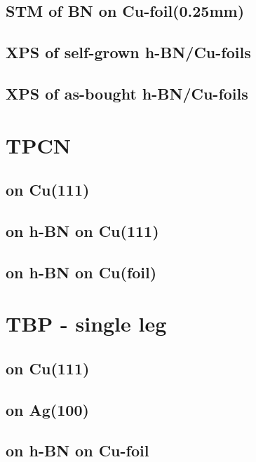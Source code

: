 \documentclass[10pt,a4paper,twoside
]{scrbook}
\begin{document}
  \section{STM of BN on Cu-foil(0.25mm)}
     
  \section{XPS of self-grown h-BN/Cu-foils}
     
  \section{XPS of as-bought h-BN/Cu-foils}
     
\printbibliography 	
\chapter{TPCN}
    \section{on Cu(111)}
       
    \section{on h-BN on Cu(111)}
       
    \section{on h-BN on Cu(foil)}
       
\printbibliography
\chapter{TBP - single leg}
   
   \section{on Cu(111)}
      
   \section{on Ag(100)}
      
   \section{on h-BN on Cu-foil}
      
\end{document}
